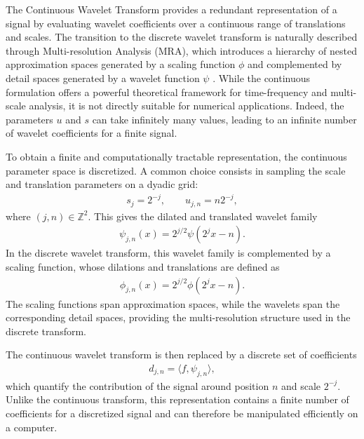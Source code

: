 The Continuous Wavelet Transform provides a redundant representation of a signal by evaluating wavelet coefficients over a continuous range of translations and scales. The transition to the discrete wavelet transform is naturally described through Multi-resolution Analysis (MRA), which introduces a hierarchy of nested approximation spaces generated by a scaling function $\phi$ and complemented by detail spaces generated by a wavelet function $\psi$ \cite{Mallat2009,Meyer1992}. While the continuous formulation offers a powerful theoretical framework for time-frequency and multi-scale analysis, it is not directly suitable for numerical applications. Indeed, the parameters $u$ and $s$ can take infinitely many values, leading to an infinite number of wavelet coefficients for a finite signal.

To obtain a finite and computationally tractable representation, the continuous parameter space is discretized. A common choice consists in sampling the scale and translation parameters on a dyadic grid:
\begin{align}
s_j = 2^{-j},
\qquad
u_{j,n} = n 2^{-j},
\end{align}
where $(j,n) \in \mathbb{Z}^2$. This gives the dilated and translated wavelet family
\begin{align}
\psi_{j,n}(x)
=
2^{j/2}
\psi\!\left(2^j x - n\right).
\end{align}
In the discrete wavelet transform, this wavelet family is complemented by a scaling function, whose dilations and translations are defined as
\begin{align}
\phi_{j,n}(x)
=
2^{j/2}
\phi\!\left(2^j x - n\right).
\end{align}
The scaling functions span approximation spaces, while the wavelets span the corresponding detail spaces, providing the multi-resolution structure used in the discrete transform.


The continuous wavelet transform is then replaced by a discrete set of coefficients
\begin{align}
d_{j,n}
=
\langle f,\psi_{j,n}\rangle,
\end{align}
which quantify the contribution of the signal around position $n$ and scale $2^{-j}$. Unlike the continuous transform, this representation contains a finite number of coefficients for a discretized signal and can therefore be manipulated efficiently on a computer.

